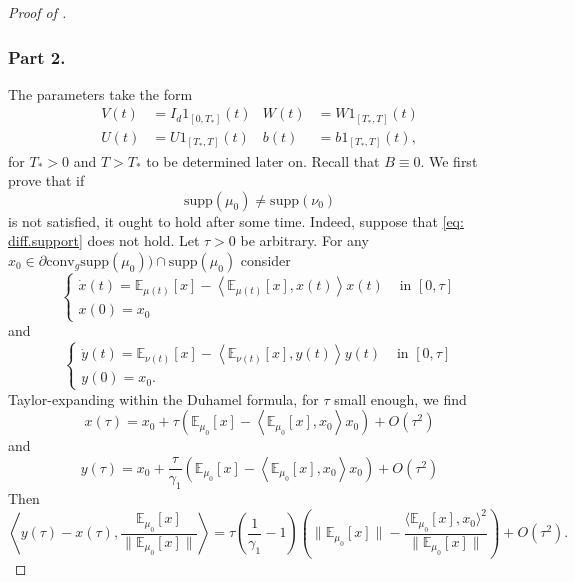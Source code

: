 \documentclass[a4paper,11pt]{article}
\theoremstyle{plain}
\newcommand{\supp}{\mathrm{supp}}
\newcommand{\conv}{\mathrm{conv}}
\newcommand{\bW}{\bm{\mathit{W}}}
\newcommand{\bV}{\bm{\mathit{V}}}
\newcommand{\bB}{\bm{\mathit{B}}}
\newcommand{\bU}{\bm{\mathit{U}}}
\numberwithin{equation}{section}
\begin{document}
\begin{proof}[Proof of ]
\subsubsection*{Part 2.}
The parameters take the form
\begin{align*}
\bV(t)&= I_d 1_{[0,T_*]}(t) & 
\bW(t)&= \bW 1_{[T_*,T]}(t) \\
\bU(t)&= \bU 1_{[T_*,T]}(t) &
b(t)&=b 1_{[T_*,T]}(t),
\end{align*}
for $T_*>0$ and $T>T_*$ to be determined later on. Recall that $\bB\equiv0$. We first prove that if
\begin{equation}\label{eq: diff.support}
\supp(\mu_0)\neq\supp(\nu_0)
\end{equation}
is not satisfied, it ought to hold after some time. 
Indeed, suppose that \eqref{eq: diff.support} does not hold. 
Let $\tau>0$ be arbitrary.
For any $x_0\in \partial\conv_g \supp(\mu_0))\cap \supp(\mu_0)$ consider
\begin{equation*}
\begin{cases}
\dot{x}(t)=\mathbb{E}_{\mu(t)}[x]-\left\langle \mathbb{E}_{\mu(t)}[x],x(t)\right\rangle x(t)&\text{ in }  [0,\tau]\\
x(0)=x_0
\end{cases}
\end{equation*}
and
\begin{equation*}
\begin{cases}
\dot{y}(t)=\mathbb{E}_{\nu(t)}[x]-\left\langle \mathbb{E}_{\nu(t)}[x],y(t)\right\rangle y(t) &\text{ in }  [0,\tau]\\
y(0)=x_0.
\end{cases}
\end{equation*}
Taylor-expanding within the Duhamel formula, for $\tau$ small enough, we find 
\begin{equation*}
x(\tau)=x_0+\tau\left(\mathbb{E}_{\mu_0
}[x]-\left\langle\mathbb{E}_{\mu_0}[x],x_0\right\rangle x_0\right)+O(\tau^2)
\end{equation*}
and
\begin{equation*}
y(\tau)=x_0+\frac{\tau}{\gamma_1}\left(\mathbb{E}_{\mu_0
}[x]-\left\langle \mathbb{E}_{\mu_0}[x],x_0\right\rangle x_0\right)+O(\tau^2)
\end{equation*}
Then
\begin{equation*}
\left\langle y(\tau)-x(\tau),\frac{\mathbb{E}_{\mu_0}
[x]}{\|\mathbb{E}_{\mu_0
}[x]\|}\right\rangle=\tau\left(\frac{1}{\gamma_1}-1\right)\left(\|\mathbb{E}_{\mu_0}[x]\|-\frac{\langle \mathbb{E}_{\mu_0}[x],x_0\rangle^2}{\|\mathbb{E}_{\mu_0}[x]\|}\right)+O(\tau^2).

\end{equation*}
\end{proof}
\end{document}
